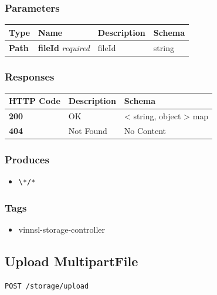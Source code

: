 \subsubsection{Parameters}\label{parameters-17}

\begin{longtable}[]{@{}llll@{}}
\toprule
Type & Name & Description & Schema\tabularnewline
\midrule
\endhead
\textbf{Path} & \textbf{fileId} \emph{required} & fileId &
string\tabularnewline
\bottomrule
\end{longtable}

\subsubsection{Responses}\label{responses-20}

\begin{longtable}[]{@{}lll@{}}
\toprule
HTTP Code & Description & Schema\tabularnewline
\midrule
\endhead
\textbf{200} & OK & \textless{} string, object \textgreater{}
map\tabularnewline
\textbf{404} & Not Found & No Content\tabularnewline
\bottomrule
\end{longtable}

\subsubsection{Produces}\label{produces-20}

\begin{itemize}
\tightlist
\item
  \texttt{\textbackslash{}*/*}
\end{itemize}

\subsubsection{Tags}\label{tags-20}

\begin{itemize}
\tightlist
\item
  vinnsl-storage-controller
\end{itemize}

\subsection{Upload MultipartFile}\label{upload-multipartfile}

\begin{verbatim}
POST /storage/upload
\end{verbatim}

